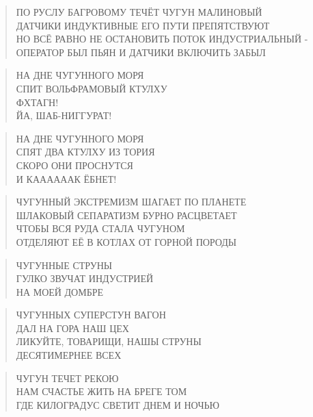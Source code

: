 \poemtitle{***}
\begin{verse}
ПО РУСЛУ БАГРОВОМУ ТЕЧЁТ ЧУГУН МАЛИНОВЫЙ\\
ДАТЧИКИ ИНДУКТИВНЫЕ ЕГО ПУТИ ПРЕПЯТСТВУЮТ\\
НО ВСЁ РАВНО НЕ ОСТАНОВИТЬ ПОТОК ИНДУСТРИАЛЬНЫЙ -\\
ОПЕРАТОР БЫЛ ПЬЯН И ДАТЧИКИ ВКЛЮЧИТЬ ЗАБЫЛ
\end{verse}

\poemtitle{***}
\begin{verse}
НА ДНЕ ЧУГУННОГО МОРЯ\\
СПИТ ВОЛЬФРАМОВЫЙ КТУЛХУ\\
ФХТАГН!\\
ЙА, ШАБ-НИГГУРАТ!
\end{verse}

\poemtitle{***}
\begin{verse}
НА ДНЕ ЧУГУННОГО МОРЯ\\
СПЯТ ДВА КТУЛХУ ИЗ ТОРИЯ\\
СКОРО ОНИ ПРОСНУТСЯ\\
И КААААААК ЁБНЕТ!
\end{verse}

\poemtitle{***}
\begin{verse}
ЧУГУННЫЙ ЭКСТРЕМИЗМ ШАГАЕТ ПО ПЛАНЕТЕ\\
ШЛАКОВЫЙ СЕПАРАТИЗМ БУРНО РАСЦВЕТАЕТ\\
ЧТОБЫ ВСЯ РУДА СТАЛА ЧУГУНОМ\\
ОТДЕЛЯЮТ ЕЁ В КОТЛАХ ОТ ГОРНОЙ ПОРОДЫ
\end{verse}

\poemtitle{***}
\begin{verse}
ЧУГУННЫЕ СТРУНЫ\\
ГУЛКО ЗВУЧАТ ИНДУСТРИЕЙ\\
НА МОЕЙ ДОМБРЕ
\end{verse}

\poemtitle{***}
\begin{verse}
ЧУГУННЫХ СУПЕРСТУН ВАГОН\\
ДАЛ НА ГОРА НАШ ЦЕХ\\
ЛИКУЙТЕ, ТОВАРИЩИ, НАШЫ СТРУНЫ\\
ДЕСЯТИМЕРНЕЕ ВСЕХ
\end{verse}

\poemtitle{***}
\begin{verse}
ЧУГУН ТЕЧЕТ РЕКОЮ\\
НАМ СЧАСТЬЕ ЖИТЬ НА БРЕГЕ ТОМ\\
ГДЕ КИЛОГРАДУС СВЕТИТ ДНЕМ И НОЧЬЮ
\end{verse}

